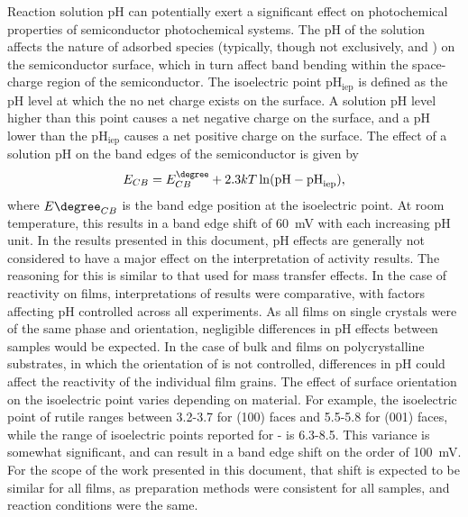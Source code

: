 \label{ph}
Reaction solution pH can potentially exert a significant effect on photochemical
properties of semiconductor photochemical systems. The pH of the solution affects the
nature of adsorbed species (typically, though not exclusively,  and )
on the semiconductor surface, which in turn affect band bending within the space-charge
region of the semiconductor. The isoelectric point pH$_{\text{iep}}$ is defined as the pH
level at which the no net charge exists on the surface. A solution pH level higher than
this point causes a net negative charge on the surface, and a pH lower than the
pH$_{\text{iep}}$ causes a net positive charge on the surface. The effect of a solution pH
on the band edges of the semiconductor is given by
\begin{equation}
E_{CB}=E^{\degree}_{CB}+2.3kT\ln(\text{pH}-\text{pH}_{\text{iep}}),
\end{equation}
where $E{\degree}_{CB}$ is the band edge position at the isoelectric point. At room
temperature, this results in a band edge shift of \SI{60}{\milli\volt} with each
increasing pH unit. In the results presented in this document, pH effects are generally
not considered to have a major effect on the interpretation of activity results. The
reasoning for this is similar to that used for mass transfer effects.  In the case of
reactivity on  films, interpretations of results were comparative, with factors
affecting pH controlled across all experiments. As all films on single crystals were of
the same phase and orientation, negligible differences in pH effects between samples would
be expected. In the case of bulk  and  films on polycrystalline
substrates, in which the orientation of  is not controlled, differences in pH
could affect the reactivity of the individual film grains. The effect of surface
orientation on the isoelectric point varies depending on material. For example, the
isoelectric point of rutile  ranges between 3.2-3.7 for (100) faces and 5.5-5.8
for (001) faces,\cite{Bullard:2006jv} while the range of isoelectric points reported for
\textalpha- is
6.3-8.5.\cite{Parks:1965ys,Kosmulski:2004vn,Kosmulski:2002kx,Kosmulski:2001ww} This
variance is somewhat significant, and can result in a band edge shift on the order of
\SI{100}{\milli\volt}. For the scope of the work presented in this document, that shift is
expected to be similar for all films, as preparation methods were consistent for all
samples, and reaction conditions were the same. 

